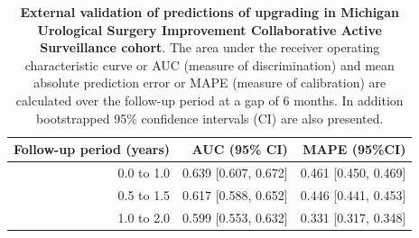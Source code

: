 \begin{table}[!htb]
\small\sf\centering
\caption{\textbf{External validation of predictions of upgrading in Michigan Urological Surgery Improvement Collaborative Active Surveillance cohort}. The area under the receiver operating characteristic curve or AUC (measure of discrimination) and mean absolute prediction error or MAPE (measure of calibration) are calculated over the follow-up period at a gap of 6 months. In addition bootstrapped 95\% confidence intervals (CI) are also presented.}
\label{tab:AUC_PE_MUSIC}
\begin{tabular}{r|r|r}
\hline
\hline
Follow-up period (years) & AUC (95\% CI) & MAPE (95\%CI)\\ 
\hline
0.0 to 1.0 & 0.639 [0.607, 0.672] & 0.461 [0.450, 0.469]\\
0.5 to 1.5 & 0.617 [0.588, 0.652] & 0.446 [0.441, 0.453]\\
1.0 to 2.0 & 0.599 [0.553, 0.632] & 0.331 [0.317, 0.348]\\
\hline
\end{tabular}	
\end{table}



